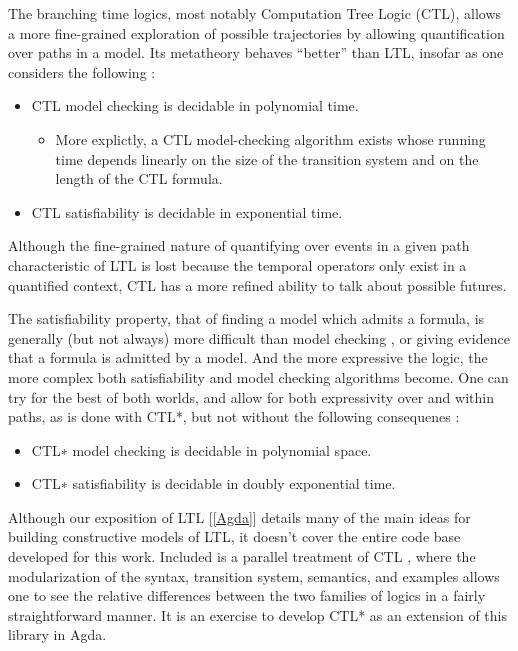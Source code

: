\documentclass{article}
\newcommand\sbref[1]{[\ref{#1}]}
\begin{document}
The branching time logics, most notably Computation Tree Logic (CTL), allows a
more fine-grained exploration of possible trajectories by allowing
quantification over paths in a model. Its metatheory behaves ``better'' than
LTL, insofar as one considers the following :

\begin{itemize}
\item CTL model checking is decidable in polynomial time.
\begin{itemize}
\item More explictly, a CTL model-checking algorithm exists whose running time
depends linearly on the size of the transition system and on the length of the CTL
formula.
\end{itemize}
\item CTL satisfiability is decidable in exponential time.
\end{itemize}

Although the fine-grained nature of quantifying over events in a given path characteristic of LTL is lost because the temporal operators only exist in a quantified context, CTL has a more refined ability to talk about possible futures.

The satisfiability property, that of finding a model which admits a formula, is
generally (but not always) more difficult than model checking \cite{satModel},
or giving evidence that a formula is admitted by a model. And the more
expressive the logic, the more complex both satisfiability and model checking
algorithms become. One can try for the best of both worlds, and allow for both expressivity over and within paths, as is done with CTL*, but not without the following consequenes :

\begin{itemize}
\item CTL∗ model checking is decidable in polynomial space.
\item CTL∗ satisfiability is decidable in doubly exponential time.
\end{itemize}

Although our exposition of LTL \sbref{Agda} details many of the main ideas for
building constructive models of LTL, it doesn't cover the entire code base
developed for this work. Included is a parallel treatment of CTL \cite{wltl},
where the modularization of the syntax, transition system, semantics, and
examples allows one to see the relative differences between the two families of
logics in a fairly straightforward manner. It is an exercise to develop CTL* as
an extension of this library in Agda.
\end{document}
